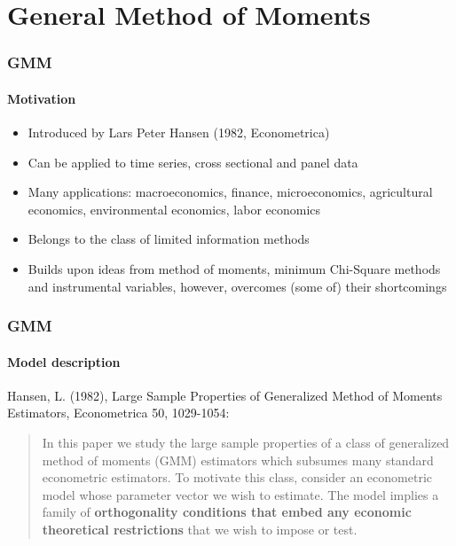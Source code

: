 \documentclass{beamer}
\begin{document}
\section{General Method of Moments}
\begin{frame}\frametitle{GMM}\framesubtitle{Motivation}
\begin{itemize}
    \item Introduced by Lars Peter Hansen (1982, Econometrica)
    \item Can be applied to time series, cross sectional and panel data
    \item Many applications: macroeconomics, finance, microeconomics, agricultural economics, environmental economics, labor economics
    \item Belongs to the class of limited information methods
    \item Builds upon ideas from method of moments, minimum Chi-Square methods and instrumental variables, however, overcomes (some of) their shortcomings
\end{itemize}
\end{frame}
\begin{frame}\frametitle{GMM}\framesubtitle{Model description}
Hansen, L. (1982), Large Sample Properties of Generalized Method of Moments Estimators, Econometrica 50, 1029-1054:
\begin{quote}
In this paper we study the large sample properties of a class of generalized
method of moments (GMM) estimators which subsumes many standard econometric
estimators. To motivate this class, consider an econometric model whose
parameter vector we wish to estimate. The model implies a family of \textbf{%
orthogonality conditions that embed any economic theoretical restrictions }%
that we wish to impose or test.
\end{quote}
\end{frame}
\end{document}
